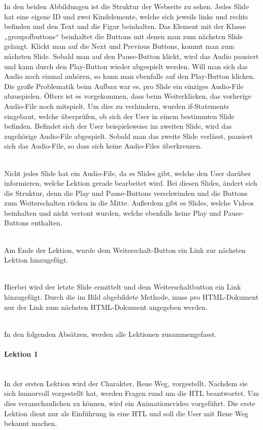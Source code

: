 In den beiden Abbildungen ist die Struktur der Webseite zu sehen. Jedes Slide hat eine eigene ID und zwei Kindelemente, welche sich jeweils links und rechts befinden und den Text und die Figur beinhalten. Das Element mit der Klasse „groupofbuttons“ beinhaltet die Buttons mit denen man zum nächsten Slide gelangt. Klickt man auf die Next und Previous Buttons, kommt man zum nächsten Slide. Sobald man auf den Pause-Button klickt, wird das Audio pausiert und kann durch den Play-Button wieder abgespielt werden. Will man sich das Audio noch einmal anhören, so kann man ebenfalls auf den Play-Button klicken. Die große Problematik beim Aufbau war es, pro Slide ein einziges Audio-File abzuspielen. Öfters ist es vorgekommen, dass beim Weiterklicken, das vorherige Audio-File noch mitspielt. Um dies zu verhindern, wurden if-Statements eingebaut, welche überprüfen, ob sich der User in einem bestimmten Slide befinden. Befindet sich der User beispielsweise im zweiten Slide, wird das zugehörige Audio-File abgespielt. Sobald man das zweite Slide verlässt, pausiert sich das Audio-File, so dass sich keine Audio-Files überkreuzen. 

\\

Nicht jedes Slide hat ein Audio-File, da es Slides gibt, welche den User darüber informieren, welche Lektion gerade bearbeitet wird. Bei diesen Slides, ändert sich die Struktur, denn die Play und Pause-Buttons verschwinden und die Buttons zum Weiterschalten rücken in die Mitte. Außerdem gibt es Slides, welche Videos beinhalten und nicht vertont wurden, welche ebenfalls keine Play und Pause-Buttons enthalten. 

\\ 

Am Ende der Lektion, wurde dem Weiterschalt-Button ein Link zur nächsten Lektion hinzugefügt. 

 \\

Hierbei wird der letzte Slide ermittelt und dem Weiterschaltbutton ein Link hinzugefügt. Durch die im Bild abgebildete Methode, muss pro HTML-Dokument nur der Link zum nächsten HTML-Dokument angegeben werden. 

\\

In den folgenden Absätzen, werden alle Lektionen zusammengefasst.
\paragraph{Lektion 1}\\
In der ersten Lektion wird der Charakter, Rene Weg, vorgestellt. Nachdem sie sich humorvoll vorgestellt hat, werden Fragen rund um die HTL beantwortet. Um dies veranschaulichen zu können, wird ein Animationsvideo vorgeführt. Die erste Lektion dient nur als Einführung in eine HTL und soll die User mit Rene Weg bekannt machen. 



